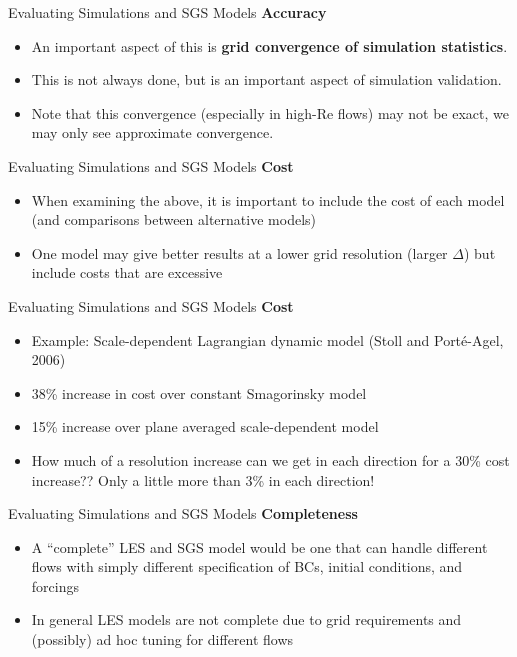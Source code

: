\begin{frame}{Evaluating Simulations and SGS Models}
\textbf{Accuracy}
\begin{itemize}
	\item An important aspect of this is \textbf{grid convergence of simulation statistics}. 
	\item This is not always done, but is an important aspect of simulation validation. 
	\item Note that this convergence (especially in high-Re flows) may not be exact, we may only see approximate convergence.
\end{itemize}
\end{frame}
\begin{frame}{Evaluating Simulations and SGS Models}
\textbf{Cost}
\begin{itemize}
	\item When examining the above, it is important to include the cost of each model (and comparisons between alternative models)
	\item One model may give better results at a lower grid resolution (larger $\Delta$) but include costs that are excessive
\end{itemize}
\end{frame}
\begin{frame}{Evaluating Simulations and SGS Models}
\textbf{Cost}
\begin{itemize}
	\item Example: Scale-dependent Lagrangian dynamic model (Stoll and Port\'{e}-Agel, 2006)
	\item 38\% increase in cost over constant Smagorinsky model
	\item 15\% increase over plane averaged scale-dependent model
	\item How much of a resolution increase can we get in each direction for a 30\% cost increase?? Only a little more than 3\% in each direction!
\end{itemize}
\end{frame}
\begin{frame}{Evaluating Simulations and SGS Models}
\textbf{Completeness}
\begin{itemize}
	\item  A ``complete'' LES and SGS model would be one that can handle different flows with simply different specification of BCs, initial conditions, and forcings
	\item In general LES models are not complete due to grid requirements and (possibly) ad hoc tuning for different flows
\end{itemize}
\end{frame}

